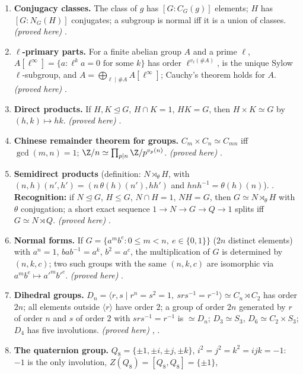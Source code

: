 \begin{enumerate}[label=\textbf{\thechapter.\arabic*}]
determinant-one subgroup of $\rho(G)$. \emph{(proved here)} .
\item \textbf{Conjugacy classes.} The class of $g$ has $[G:C_G(g)]$ elements; $H$ has $[G:N_G(H)]$ conjugates; a subgroup is normal
iff it is a union of classes. \emph{(proved here)} .
\item \textbf{$\ell$-primary parts.} For a finite abelian group $A$ and a prime $\ell$, $A[\ell^\infty]=\{a:\ell^ka=0\text{ for some }k\}$ has order
$\ell^{v_\ell(\#A)}$, is the unique Sylow $\ell$-subgroup, and $A=\bigoplus_{\ell\mid\#A}A[\ell^\infty]$; Cauchy's theorem holds for $A$.
\emph{(proved here)} .
\item \textbf{Direct products.} If $H,K\trianglelefteq G$, $H\cap K=1$, $HK=G$, then $H\times K\simeq G$ by $(h,k)\mapsto hk$. \emph{(proved here)}
.
\item \textbf{Chinese remainder theorem for groups.} $C_m\times C_n\simeq C_{mn}$ iff $\gcd(m,n)=1$; $\Z/n\simeq\prod_{p\mid n}\Z/p^{v_p(n)}$.
\emph{(proved here)} .
\item \textbf{Semidirect products} (definition: $N\rtimes_\theta H$, with $(n,h)(n',h')=(n\,\theta(h)(n'),hh')$ and $hnh^{-1}=\theta(h)(n)$).
. \textbf{Recognition:} if $N\trianglelefteq G$, $H\le G$, $N\cap H=1$, $NH=G$, then $G\simeq N\rtimes_\theta H$ with $\theta$
conjugation; a short exact sequence $1\to N\to G\to Q\to1$ splits iff $G\simeq N\rtimes Q$. \emph{(proved here)}
.
\item \textbf{Normal forms.} If $G=\{a^mb^e:0\le m<n,\ e\in\{0,1\}\}$ ($2n$ distinct elements) with $a^n=1$, $bab^{-1}=a^k$, $b^2=a^c$, the multiplication of $G$ is
determined by $(n,k,c)$; two such groups with the same $(n,k,c)$ are isomorphic via $a^mb^e\mapsto a'^mb'^e$. \emph{(proved here)} .
\item \textbf{Dihedral groups.} $D_n=\langle r,s\mid r^n=s^2=1,\ srs^{-1}=r^{-1}\rangle\simeq C_n\rtimes C_2$ has order $2n$; all elements outside
$\langle r\rangle$ have order $2$; a group of order $2n$ generated by $r$ of order $n$ and $s$ of order $2$ with $srs^{-1}=r^{-1}$ is $\simeq D_n$;
$D_3\simeq S_3$, $D_6\simeq C_2\times S_3$; $D_4$ has five involutions. \emph{(proved here)} ,
.
\item \textbf{The quaternion group.} $Q_8=\{\pm1,\pm i,\pm j,\pm k\}$, $i^2=j^2=k^2=ijk=-1$: $-1$ is the only involution, $Z(Q_8)=[Q_8,Q_8]=\{\pm1\}$,

\end{enumerate}
